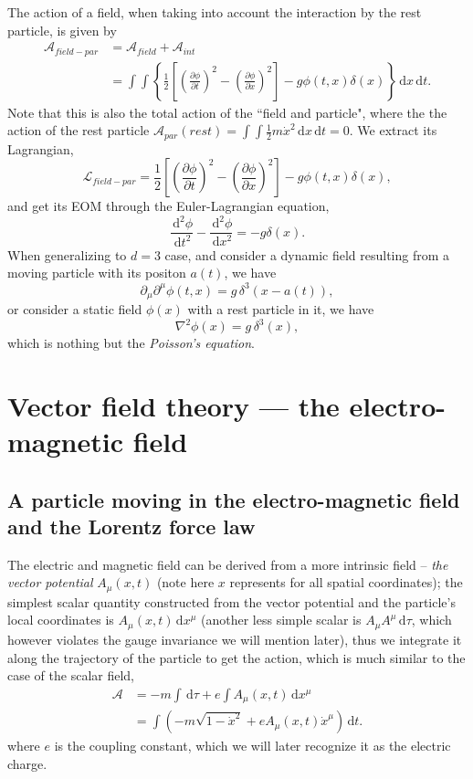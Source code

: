 \documentclass{article}
\newcommand{\be}{\begin{equation}}
\newcommand{\ee}{\end{equation}}
\newcommand{\dif}{\,\mathrm{d}}
\newcommand{\p}{\partial}
\newcommand{\1}{\left}
\newcommand{\2}{\right}
\newcommand{\ma}{\mathcal}
\begin{document}
The action of a field, when taking into account the interaction by the rest particle, is given by
\be
\begin{split}
\ma A_{field-par} &= \ma A_{field} + \ma A_{int} \\
&= \int\int \1\lbrace \frac 1 2 \1[\1(\frac{\p \phi}{\p t}\2)^2 - \1(\frac{\p \phi}{\p x}\2)^2\2] -g\phi(t,x)\delta(x) \2\rbrace \dif x \dif t.
\end{split}
\ee
Note that this is also the total action of the ``field and particle", where the the action of the rest particle $\ma A_{par}(rest)=\int\int \frac1 2 m \dot x^2 \dif x \dif t = 0$. We extract its Lagrangian,
\be
\ma L_{field-par} =  \frac 1 2 \1[\1(\frac{\p \phi}{\p t}\2)^2 - \1(\frac{\p \phi}{\p x}\2)^2\2] -g\phi(t,x)\delta(x),
\ee
and get its EOM through the Euler-Lagrangian equation,
\be
\frac{\dif^2 \phi}{\dif t^2} - \frac{\dif^2 \phi}{\dif x^2} = -g\delta(x).
\ee
When generalizing to $d=3$ case, and consider a dynamic field resulting from a moving particle with its positon $a(t)$, we have
\be
\p_\mu\p^\mu\phi(t,x)=g\,\delta^3(x-a(t)),
\ee
or consider a static field $\phi(x)$ with a rest particle in it, we have
\be
\nabla^2 \phi(x) = g\,\delta^3(x),
\ee
which is nothing but the \textit{Poisson's equation}.

\newpage
\section{Vector field theory --- the electro-magnetic field}
\subsection{A particle moving in the electro-magnetic field and the Lorentz force law}
The electric and magnetic field can be derived from a more intrinsic field -- \textit{the vector potential} $A_\mu (x,t)$ (note here $x$ represents for all spatial coordinates); the simplest scalar quantity constructed from the vector potential and the particle's local coordinates is $A_\mu(x,t) \dif x^\mu$ (another less simple scalar is $A_\mu A^\mu \dif\tau$, which however violates the gauge invariance we will mention later), thus we integrate it along the trajectory of the particle to get the action, which is much similar to the case of the scalar field,
\be
\begin{split}
\ma A &= -m\int\dif\tau + e\int A_\mu(x,t) \dif x^\mu \\
&=\int \1(-m\sqrt{1-\dot x^2} + e A_\mu(x,t)\dot x^\mu \2) \dif t.
\end{split}
\ee
where $e$ is the coupling constant, which we will later recognize it as the electric charge. \\
\end{document}

